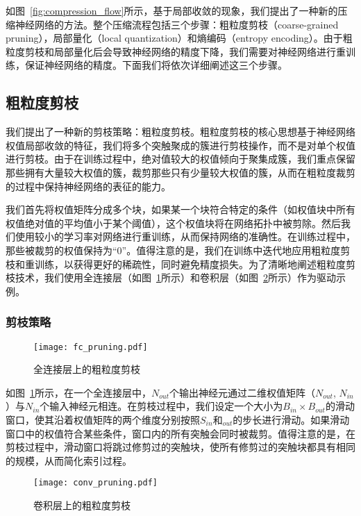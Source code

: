 如图~\ref{fig:compression_flow}所示，基于局部收敛的现象，我们提出了一种新的压缩神经网络的方法。整个压缩流程包括三个步骤：粗粒度剪枝（coarse-grained pruning），局部量化（local quantization）和熵编码（entropy encoding）。由于粗粒度剪枝和局部量化后会导致神经网络的精度下降，我们需要对神经网络进行重训练，保证神经网络的精度。下面我们将依次详细阐述这三个步骤。


\subsection{粗粒度剪枝}

我们提出了一种新的剪枝策略：粗粒度剪枝。粗粒度剪枝的核心思想基于神经网络权值局部收敛的特征，我们将多个突触聚成的簇进行剪枝操作，而不是对单个权值进行剪枝。由于在训练过程中，绝对值较大的权值倾向于聚集成簇，我们重点保留那些拥有大量较大权值的簇，裁剪那些只有少量较大权值的簇，从而在粗粒度裁剪的过程中保持神经网络的表征的能力。

我们首先将权值矩阵分成多个块，如果某一个块符合特定的条件（如权值块中所有权值绝对值的平均值小于某个阈值），这个权值块将在网络拓扑中被剪除。然后我们使用较小的学习率对网络进行重训练，从而保持网络的准确性。在训练过程中，那些被裁剪的权值保持为“0”。值得注意的是，我们在训练中迭代地应用粗粒度剪枝和重训练，以获得更好的稀疏性，同时避免精度损失。为了清晰地阐述粗粒度剪枝技术，我们使用全连接层（如图~\ref{fig:fc_pruning}所示）和卷积层（如图~\ref{fig:conv_pruning}所示）作为驱动示例。

\subsubsection{剪枝策略}

\begin{figure}[h]
\centering
\texttt{[image: fc\_pruning.pdf]}
\caption{全连接层上的粗粒度剪枝}
\label{fig:fc_pruning}
\end{figure}

如图~\ref{fig:fc_pruning}所示，在一个全连接层中，$N_{out}$个输出神经元通过二维权值矩阵（$N_{out}$, $N_{in}$）与$N_{in}$个输入神经元相连。在剪枝过程中，我们设定一个大小为$B_{in} \times B_{out}$的滑动窗口，使其沿着权值矩阵的两个维度分别按照$S_{in}$和$_{out}$的步长进行滑动。如果滑动窗口中的权值符合某些条件，窗口内的所有突触会同时被裁剪。值得注意的是，在剪枝过程中，滑动窗口将跳过修剪过的突触块，使所有修剪过的突触块都具有相同的规模，从而简化索引过程。

\begin{figure}[h]
  \centering
  \texttt{[image: conv\_pruning.pdf]}
  \caption{卷积层上的粗粒度剪枝}
  \label{fig:conv_pruning}
\end{figure}

